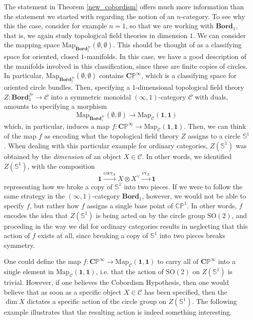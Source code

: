\documentclass[a4paper,11pt]{article}
\newcommand{\ccal}{\mathcal{C}}
\theoremstyle{plain}
\theoremstyle{definition}
\theoremstyle{remark}
\begin{document}
The statement in Theorem \ref{new_cobordism} offers much more information than the statement we started with regarding the notion of an $n$-category. To see why this the case, consider for example $n = 1$, so that we are working with $\textbf{Bord}_1$, that is, we again study topological field theories in dimension $1$. We can consider the mapping space $\text{Map}_{\textbf{Bord}_1^{fr}}(\emptyset, \emptyset)$. This should be thought of as a classifying space for oriented, closed $1$-manifolds. In this case, we have a good description of the manifolds involved in this classification, since these are finite copies of circles. In particular, $\text{Map}_{\textbf{Bord}_1^{fr}}(\emptyset, \emptyset)$ contains $\mathbf{C}\mathbb{P}^{\infty}$, which is a classifying space for oriented circle bundles. Then, specifying a $1$-dimensional topological field theory $Z \colon \textbf{Bord}_1^{fr} \to \ccal$ into a symmetric monoidal $(\infty, 1)$-category $\ccal$ with duals, amounts to specifying a morphism 
$$\text{Map}_{\textbf{Bord}_1^{fr}}(\emptyset, \emptyset) \to \text{Map}_{\ccal}(\mathbf{1}, \mathbf{1})$$
which, in particular, induces a map $f \colon \mathbf{C} \mathbb{P}^{\infty} \to \text{Map}_{\ccal}(\mathbf{1}, \mathbf{1})$. Then, we can think of the map $f$ as encoding what the topological field theory $Z$ assigns to a circle $\mathbb{S}^1$. When dealing with this particular example for ordinary categories, $Z(\mathbb{S}^1)$ was obtained by the \textit{dimension} of an object $X \in \ccal$. In other words, we identified $Z(\mathbb{S}^1)$, with the composition 
$$\mathbf{1} \xrightarrow{\text{coev}_X} X \otimes X^{\lor} \xrightarrow{\text{ev}_X} \mathbf{1}$$
representing how we broke a copy of $\mathbb{S}^1$ into two pieces. If we were to follow the same strategy in the $(\infty, 1)$-category $\textbf{Bord}_1$, however, we would not be able to specify $f$, but rather how $f$ assigns a single base point of $\mathbb{C} \mathbb{P}^1$. In other words, $f$ encodes the idea that $Z(\mathbb{S}^1)$ is being acted on by the circle group $\text{SO}(2)$, and proceding in the way we did for ordinary categories results in neglecting that this action of $f$ exists at all, since breaking a copy of $\mathbb{S}^1$ into two pieces breaks symmetry. 


One could define the map $f \colon \mathbf{C} \mathbb{P}^{\infty} \to \text{Map}_{\ccal}(\mathbf{1}, \mathbf{1})$ to carry all of $\mathbf{C}\mathbb{P}^{\infty}$ into a single element in $\text{Map}_{\ccal}(\mathbf{1}, \mathbf{1})$, i.e. that the action of $\text{SO}(2)$ on $Z(\mathbb{S}^1)$ is trivial. However, if one believes the Cobordism Hypothesis, then one would believe that as soon as a specific object $X \in \ccal$ has been specified, then the $\dim X$ dictates a specific action of the circle group on $Z(\mathbb{S}^1)$. The following example illustrates that the resulting action is indeed something interesting.
\end{document}
